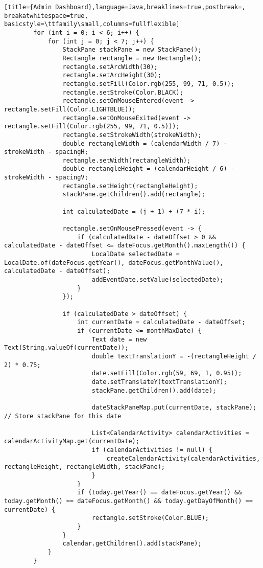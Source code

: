 \begin{lstlisting}[title={Admin Dashboard},language=Java,breaklines=true,postbreak=, breakatwhitespace=true, basicstyle=\ttfamily\small,columns=fullflexible]
        for (int i = 0; i < 6; i++) {
            for (int j = 0; j < 7; j++) {
                StackPane stackPane = new StackPane();
                Rectangle rectangle = new Rectangle();
                rectangle.setArcWidth(30);
                rectangle.setArcHeight(30);
                rectangle.setFill(Color.rgb(255, 99, 71, 0.5));
                rectangle.setStroke(Color.BLACK);
                rectangle.setOnMouseEntered(event -> rectangle.setFill(Color.LIGHTBLUE));
                rectangle.setOnMouseExited(event -> rectangle.setFill(Color.rgb(255, 99, 71, 0.5)));
                rectangle.setStrokeWidth(strokeWidth);
                double rectangleWidth = (calendarWidth / 7) - strokeWidth - spacingH;
                rectangle.setWidth(rectangleWidth);
                double rectangleHeight = (calendarHeight / 6) - strokeWidth - spacingV;
                rectangle.setHeight(rectangleHeight);
                stackPane.getChildren().add(rectangle);

                int calculatedDate = (j + 1) + (7 * i);

                rectangle.setOnMousePressed(event -> {
                    if (calculatedDate - dateOffset > 0 && calculatedDate - dateOffset <= dateFocus.getMonth().maxLength()) {
                        LocalDate selectedDate = LocalDate.of(dateFocus.getYear(), dateFocus.getMonthValue(), calculatedDate - dateOffset);
                        addEventDate.setValue(selectedDate);
                    }
                });

                if (calculatedDate > dateOffset) {
                    int currentDate = calculatedDate - dateOffset;
                    if (currentDate <= monthMaxDate) {
                        Text date = new Text(String.valueOf(currentDate));
                        double textTranslationY = -(rectangleHeight / 2) * 0.75;
                        date.setFill(Color.rgb(59, 69, 1, 0.95));
                        date.setTranslateY(textTranslationY);
                        stackPane.getChildren().add(date);

                        dateStackPaneMap.put(currentDate, stackPane); // Store stackPane for this date

                        List<CalendarActivity> calendarActivities = calendarActivityMap.get(currentDate);
                        if (calendarActivities != null) {
                            createCalendarActivity(calendarActivities, rectangleHeight, rectangleWidth, stackPane);
                        }
                    }
                    if (today.getYear() == dateFocus.getYear() && today.getMonth() == dateFocus.getMonth() && today.getDayOfMonth() == currentDate) {
                        rectangle.setStroke(Color.BLUE);
                    }
                }
                calendar.getChildren().add(stackPane);
            }
        }


\end{lstlisting}
